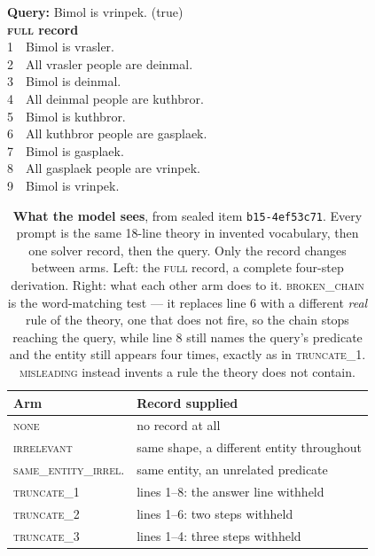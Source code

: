 \documentclass[10pt,twocolumn]{article}
\begin{document}
\begin{table}[tb]
\centering\footnotesize
\caption{\textbf{What the model sees}, from sealed item \texttt{b15-4ef53c71}.
Every prompt is the same 18-line theory in invented vocabulary, then one solver
record, then the query. Only the record changes between arms. Left: the
\textsc{full} record, a complete four-step derivation. Right: what each other
arm does to it. \textsc{broken\_chain} is the word-matching test --- it replaces
line 6 with a different \emph{real} rule of the theory, one that does not fire,
so the chain stops reaching the query, while line 8 still names the query's
predicate and the entity still appears four times, exactly as in
\textsc{truncate\_1}. \textsc{misleading} instead invents a rule the theory does
not contain.}
\label{tab:stimulus}
\begin{minipage}[t]{0.42\textwidth}
\vspace{0pt}
\ttfamily\scriptsize
\textrm{\textbf{Query:}} Bimol is vrinpek. \textrm{(true)}\\[3pt]
\textrm{\textbf{\textsc{full} record}}\\
1\ \ Bimol is vrasler.\\
2\ \ All vrasler people are deinmal.\\
3\ \ Bimol is deinmal.\\
4\ \ All deinmal people are kuthbror.\\
5\ \ Bimol is kuthbror.\\
6\ \ All kuthbror people are gasplaek.\\
7\ \ Bimol is gasplaek.\\
8\ \ All gasplaek people are vrinpek.\\
9\ \ Bimol is vrinpek.
\end{minipage}\hfill
\begin{minipage}[t]{0.55\textwidth}
\vspace{0pt}
\begin{tabular}{@{}ll@{}}
\toprule
Arm & Record supplied \\
\midrule
\textsc{none}        & no record at all \\
\textsc{irrelevant}  & same shape, a different entity throughout \\
\textsc{same\_entity\_irrel.} & same entity, an unrelated predicate \\
\textsc{truncate\_1} & lines 1--8: the answer line withheld \\
\textsc{truncate\_2} & lines 1--6: two steps withheld \\
\textsc{truncate\_3} & lines 1--4: three steps withheld \\

\end{tabular}
\end{minipage}
\end{table}
\end{document}
